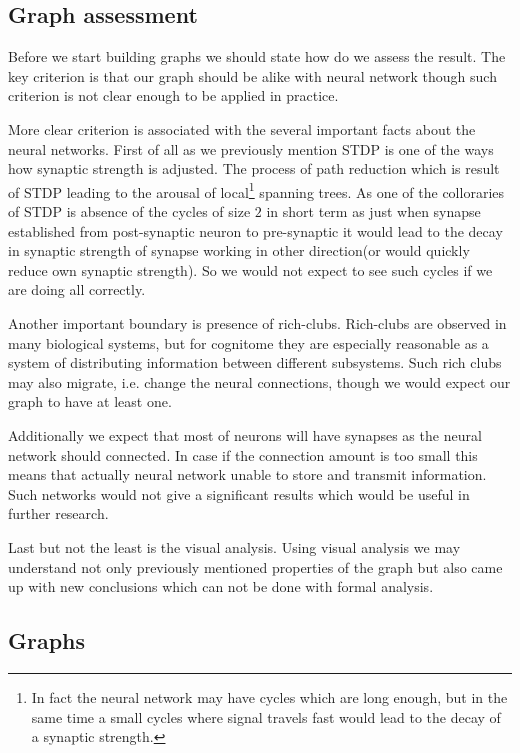 \documentclass{article}
\begin{document}
	\subsection{Graph assessment}\label{subsec:graph-assessment}

	Before we start building graphs we should state how do we assess the result.
	The key criterion is that our graph should be alike with neural network
	though such criterion is not clear enough to be applied in practice.

	More clear criterion is associated with the several important facts about the neural networks.
	First of all as we previously mention STDP is one of the ways how synaptic strength is adjusted.
	The process of path reduction which is result of STDP leading to the arousal of local\footnote{
	    In fact the neural network may have cycles which are long enough, but in the same time a small cycles where
	    signal travels fast would lead to the decay of a synaptic strength.
	} spanning trees.
	As one of the colloraries of STDP is absence of the cycles of size $2$ in short term as just when synapse established
	from post-synaptic neuron to pre-synaptic it would lead to the decay in synaptic strength of synapse working in other
	direction(or would quickly reduce own synaptic strength).
	So we would not expect to see such cycles if we are doing
	all correctly.

	Another important boundary is presence of rich-clubs.
	Rich-clubs are observed in many biological systems, but for cognitome they are especially reasonable
	as a system of distributing information between different subsystems.
	Such rich clubs may also migrate, i.e. change the neural connections, though we would expect our graph to
	have at least one.

	Additionally we expect that most of neurons will have synapses as the neural network should connected.
	In case if the connection amount is too small this means that actually neural network unable to store and
	transmit information.
	Such networks would not give a significant results which would be useful in further research.

	Last but not the least is the visual analysis.
	Using visual analysis we may understand not only previously mentioned properties of the graph
	but also came up with new conclusions which can not be done with formal analysis.

	\subsection{Graphs}\label{subsec:graphs}
\end{document}
